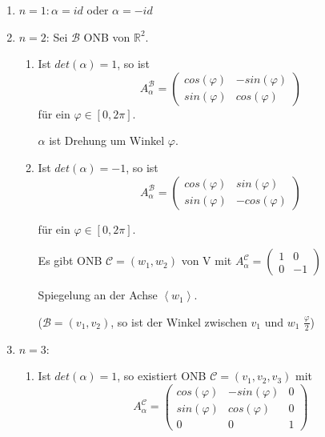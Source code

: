 \documentclass[a4paper, openany]{book}
\begin{document}
        \begin{enumerate}[label=(\alph*)] 
          \item $n = 1: \alpha = id$ oder $\alpha = - id$

          \item $n = 2$: Sei $\mathcal{B}$ ONB von $\mathbb{R}^2$.

          \begin{enumerate}[label=(\roman*)]
            \item Ist $det(\alpha) = 1$, so ist \[ A_{\alpha}^{\mathcal{B}} = \begin{pmatrix}cos(\varphi) & - sin(\varphi) \\ sin(\varphi) & cos(\varphi) \end{pmatrix}\] für ein $\varphi \in [0, 2 \pi]$.

            $\alpha$ ist Drehung um Winkel $\varphi$.

            \item Ist $det(\alpha) = -1$, so ist \[ A_{\alpha}^{\mathcal{B}} = \begin{pmatrix}cos(\varphi) & sin(\varphi) \\ sin(\varphi) & - cos(\varphi) \end{pmatrix} \]

            für ein $\varphi \in [0, 2 \pi]$.

            Es gibt ONB $\mathcal{C} = (w_1, w_2)$ von V mit $A_{\alpha}^{\mathcal{C}} = \begin{pmatrix}1 & 0 \\ 0 & -1 \end{pmatrix}$

            \par \medskip

            Spiegelung an der Achse $\left \langle w_1 \right \rangle$.

            ($\mathcal{B} = (v_1, v_2)$, so ist der Winkel zwischen $v_1$ und $w_1$ $\frac{\varphi}{2}$)

          \end{enumerate}

          \item $n = 3$: 

          \begin{enumerate}[label=(\roman*)]
            \item Ist $det(\alpha) = 1$, so existiert ONB $\mathcal{C} = (v_1, v_2, v_3)$ mit \[ A_{\alpha}^{\mathcal{C}} = \begin{pmatrix}cos(\varphi) & - sin(\varphi) & 0 \\ sin(\varphi) & cos(\varphi) & 0 \\ 0 & 0 & 1 \end{pmatrix} \]


\end{enumerate}
\end{enumerate}
\end{document}
